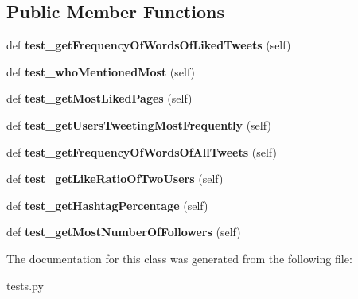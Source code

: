 \subsection*{Public Member Functions}
\begin{DoxyCompactItemize}
\item 
\mbox{\label{classtwitter_1_1tests_1_1_stats_test_cases_ae7e663218f193abe62a2ec355bcd976e}} 
def {\bfseries test\+\_\+get\+Frequency\+Of\+Words\+Of\+Liked\+Tweets} (self)
\item 
\mbox{\label{classtwitter_1_1tests_1_1_stats_test_cases_aab32d136d9438b12de98a3f691946432}} 
def {\bfseries test\+\_\+who\+Mentioned\+Most} (self)
\item 
\mbox{\label{classtwitter_1_1tests_1_1_stats_test_cases_a78a25891e8faaa226a38a43539ecb5a9}} 
def {\bfseries test\+\_\+get\+Most\+Liked\+Pages} (self)
\item 
\mbox{\label{classtwitter_1_1tests_1_1_stats_test_cases_ab61ba217f8dfe8a84e7d33de828bdaf2}} 
def {\bfseries test\+\_\+get\+Users\+Tweeting\+Most\+Frequently} (self)
\item 
\mbox{\label{classtwitter_1_1tests_1_1_stats_test_cases_a3581f04cb8a74b0559e63ed8caccce4d}} 
def {\bfseries test\+\_\+get\+Frequency\+Of\+Words\+Of\+All\+Tweets} (self)
\item 
\mbox{\label{classtwitter_1_1tests_1_1_stats_test_cases_a2379f24f8f9c91e49709bc01e8d32637}} 
def {\bfseries test\+\_\+get\+Like\+Ratio\+Of\+Two\+Users} (self)
\item 
\mbox{\label{classtwitter_1_1tests_1_1_stats_test_cases_ae2af08fbd0d5c8d92b1e8f5d0a183ede}} 
def {\bfseries test\+\_\+get\+Hashtag\+Percentage} (self)
\item 
\mbox{\label{classtwitter_1_1tests_1_1_stats_test_cases_af724a16f2c313472fb69dc39e727c23b}} 
def {\bfseries test\+\_\+get\+Most\+Number\+Of\+Followers} (self)
\end{DoxyCompactItemize}


The documentation for this class was generated from the following file\+:\begin{DoxyCompactItemize}
\item 
tests.\+py\end{DoxyCompactItemize}
